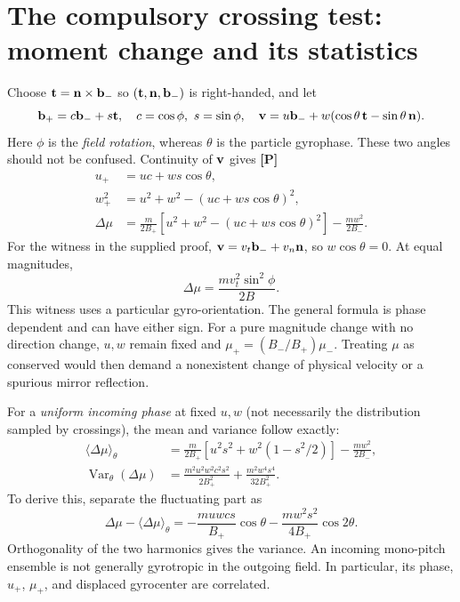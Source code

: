 \documentclass[10pt,a4paper]{article}
\newcommand{\avg}[1]{\langle #1\rangle}
\newcommand{\proved}{\textbf{[P]}}
\begin{document}
\section{The compulsory crossing test: moment change and its statistics}
\label{sec:mu}
Choose $\mathbf t=\mathbf n\times\mathbf b_-$ so $(\mathbf t,\mathbf n,\mathbf b_-)$ is right-handed, and let
\begin{equation}
 \bunit_+=c\bunit_-+s\mathbf t,\quad c=\cos\phi,\ s=\sin\phi,
 \quad \v=u\bunit_-+w(\cos\theta\,\mathbf t-\sin\theta\,\n).
\end{equation}
Here $\phi$ is the \emph{field rotation}, whereas $\theta$ is the particle gyrophase. These two angles should not be confused. Continuity of $\mathbf v$ gives \proved{}
\begin{align}\label{eq:momentreset}
 u_+&=uc+ws\cos\theta,\\
 w_+^2&=u^2+w^2-(uc+ws\cos\theta)^2,\\
 \Delta\mu&=\frac{m}{2B_+}\left[u^2+w^2-(uc+ws\cos\theta)^2\right]
                 -\frac{mw^2}{2B_-}.
\end{align}
For the witness in the supplied proof, $\mathbf v=v_t\mathbf b_-+v_n\mathbf n$, so $w\cos\theta=0$. At equal magnitudes,
\begin{equation}\label{eq:witness}
 \Delta\mu=\frac{m v_t^2\sin^2\phi}{2B}.
\end{equation}
This witness uses a particular gyro-orientation. The general formula is phase dependent and can have either sign. For a pure magnitude change with no direction change, $u,w$ remain fixed and $\mu_+=(B_-/B_+)\mu_-$. Treating $\mu$ as conserved would then demand a nonexistent change of physical velocity or a spurious mirror reflection.

For a \emph{uniform incoming phase} at fixed $u,w$ (not necessarily the distribution sampled by crossings), the mean and variance follow exactly:
\begin{align}\label{eq:muavg}
 \avg{\Delta\mu}_\theta
 &=\frac{m}{2B_+}\left[u^2s^2+w^2(1-s^2/2)\right]-\frac{mw^2}{2B_-},\\
 \operatorname{Var}_\theta(\Delta\mu)
 &=\frac{m^2u^2w^2c^2s^2}{2B_+^2}
       +\frac{m^2w^4s^4}{32B_+^2}.
\end{align}
To derive this, separate the fluctuating part as
\begin{equation}
 \Delta\mu-\avg{\Delta\mu}_\theta
 =-\frac{muwcs}{B_+}\cos\theta
    -\frac{mw^2s^2}{4B_+}\cos2\theta.
\end{equation}
Orthogonality of the two harmonics gives the variance. An incoming mono-pitch ensemble is not generally gyrotropic in the outgoing field. In particular, its phase, $u_+$, $\mu_+$, and displaced gyrocenter are correlated.
\end{document}
